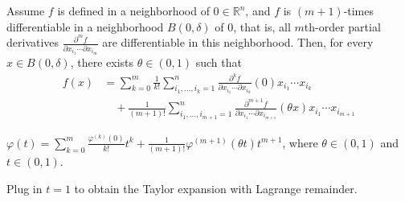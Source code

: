 \begin{theorem}
    Assume $f$ is defined in a neighborhood of $0\in\mathbb{R}^n$, and $f$ is $(m+1)$-times differentiable in a neighborhood $B(0,\delta)$ of $0$, that is, all $m$th-order partial derivatives $\frac{\partial^mf}{\partial x_{i_1}\cdots\partial x_{i_m}}$ are differentiable in this neighborhood. Then, for every $x\in B(0,\delta)$, there exists $\theta\in(0,1)$ such that
    \begin{align*}
        f(x) & =\sum_{k=0}^m\frac{1}{k!}\sum_{i_1,\dots,i_k=1}^n\frac{\partial^kf}{\partial x_{i_1}\cdots\partial x_{i_k}}(0)x_{i_1}\cdots x_{i_k}                     \\
             & \quad+\frac{1}{(m+1)!}\sum_{i_1,\dots,i_{m+1}=1}^n\frac{\partial^{m+1}f}{\partial x_{i_1}\cdots\partial x_{i_{m+1}}}(\theta x)x_{i_1}\cdots x_{i_{m+1}}
    \end{align*}

    \begin{pf}
        $\varphi(t)=\sum_{k=0}^m\frac{\varphi^{(k)}(0)}{k!}t^k+\frac{1}{(m+1)!}\varphi^{(m+1)}(\theta t)t^{m+1}$, where $\theta\in(0,1)$ and $t\in(0,1)$.

        Plug in $t=1$ to obtain the Taylor expansion with Lagrange remainder.
    \end{pf}
\end{theorem}
